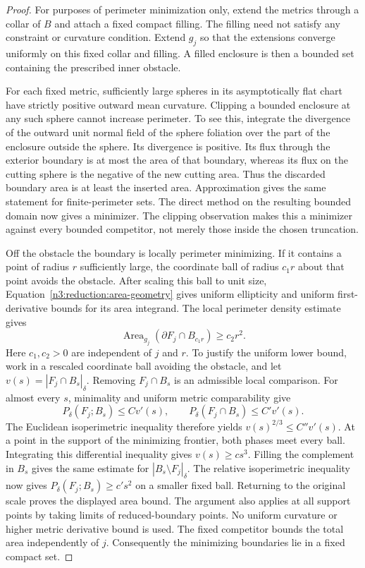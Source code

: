 \begin{proof}
For purposes of perimeter minimization only, extend the metrics through
a collar of $B$ and attach a fixed compact filling.  The filling need not
satisfy any constraint or curvature condition.  Extend $g_j$ so that the
extensions converge uniformly on this fixed collar and filling.  A filled
enclosure is then a bounded set containing the prescribed inner obstacle.

For each fixed metric, sufficiently large spheres in its asymptotically
flat chart have strictly positive outward mean curvature.  Clipping a
bounded enclosure at any such sphere cannot increase perimeter.  To see
this, integrate the divergence of the outward unit normal field of the
sphere foliation over the part of the enclosure outside the sphere.  Its
divergence is positive.  Its flux through the exterior boundary is at
most the area of that boundary, whereas its flux on the cutting sphere
is the negative of the new cutting area.  Thus the discarded boundary
area is at least the inserted area.  Approximation gives the same
statement for finite-perimeter sets.  The direct method on the resulting
bounded domain now gives a minimizer.  The clipping observation makes
this a minimizer against every bounded competitor, not merely those
inside the chosen truncation.

Off the obstacle the boundary is locally perimeter minimizing.  If it
contains a point of radius $r$ sufficiently large, the coordinate ball
of radius $c_1r$ about that point avoids the obstacle.  After scaling
this ball to unit size, Equation~\eqref{n3:reduction:area-geometry} gives
uniform ellipticity and uniform first-derivative bounds for its area
integrand.  The local perimeter density estimate gives
\[
 \operatorname{Area}_{g_j}
       (\partial F_j\cap B_{c_1r})\ge c_2r^2.
\]
Here $c_1,c_2>0$ are independent of $j$ and $r$. To justify the
uniform lower bound, work in a rescaled coordinate ball avoiding the
obstacle, and let $v(s)=|F_j\cap B_s|_\delta$. Removing $F_j\cap B_s$
is an admissible local comparison. For almost every $s$, minimality
and uniform metric comparability give
\[
 P_\delta(F_j;B_s)\le C v'(s),\qquad
 P_\delta(F_j\cap B_s)\le C'v'(s).
\]
The Euclidean isoperimetric inequality therefore yields
$v(s)^{2/3}\le C''v'(s)$. At a point in the support of the minimizing
frontier, both phases meet every ball. Integrating this differential
inequality gives $v(s)\ge c s^3$. Filling the complement in $B_s$
gives the same estimate for $|B_s\setminus F_j|_\delta$. The relative
isoperimetric inequality now gives
$P_\delta(F_j;B_s)\ge c's^2$ on a smaller fixed ball. Returning to
the original scale proves the displayed area bound. The argument also
applies at all support points by taking limits of reduced-boundary
points. No uniform curvature or higher metric derivative bound is used.
The fixed competitor bounds the total area independently of $j$.
Consequently the minimizing boundaries lie in a fixed compact set.


\end{proof}
